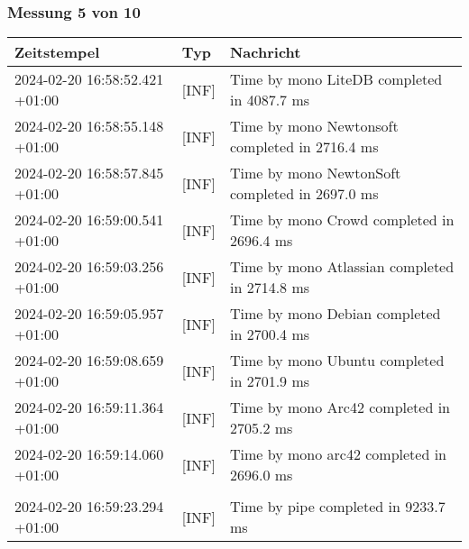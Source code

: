     \subsubsection{Messung 5 von 10} \label{subsubsec:LiteDbWenigerPaketeAlsDb5von10}
        {
            {\small
                \begin{tabularx}{\textwidth}{|l|l|X|}
                    \hline
                    \textbf{Zeitstempel} & \textbf{Typ} & \textbf{Nachricht} \\
                    \hline
                    \endhead
                    2024-02-20 16:58:52.421 +01:00 & [INF] & Time by mono LiteDB completed in 4087.7 ms \\
                    2024-02-20 16:58:55.148 +01:00 & [INF] & Time by mono Newtonsoft completed in 2716.4 ms \\
                    2024-02-20 16:58:57.845 +01:00 & [INF] & Time by mono NewtonSoft completed in 2697.0 ms \\
                    2024-02-20 16:59:00.541 +01:00 & [INF] & Time by mono Crowd completed in 2696.4 ms \\
                    2024-02-20 16:59:03.256 +01:00 & [INF] & Time by mono Atlassian completed in 2714.8 ms \\
                    2024-02-20 16:59:05.957 +01:00 & [INF] & Time by mono Debian completed in 2700.4 ms \\
                    2024-02-20 16:59:08.659 +01:00 & [INF] & Time by mono Ubuntu completed in 2701.9 ms \\
                    2024-02-20 16:59:11.364 +01:00 & [INF] & Time by mono Arc42 completed in 2705.2 ms \\
                    2024-02-20 16:59:14.060 +01:00 & [INF] & Time by mono arc42 completed in 2696.0 ms \\
                    & & \\
                    2024-02-20 16:59:23.294 +01:00 & [INF] & Time by pipe completed in 9233.7 ms \\
                    \hline
                \end{tabularx}
            }
        }

